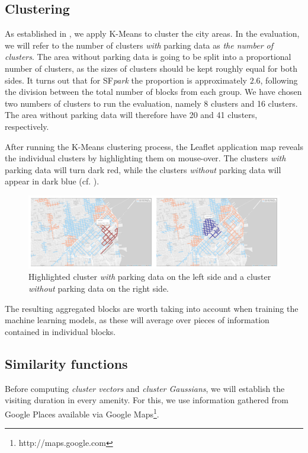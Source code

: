 \subsection{Clustering}
\label{experimental_setup:clustering}
As established in , we apply K-Means to cluster the city areas.
In the evaluation, we will refer to the number of clusters \textit{with} parking data as \textit{the number of clusters}.
The area without parking data is going to be split into a proportional number of clusters, as the sizes of clusters should be kept roughly equal for both sides.
It turns out that for SF\textit{park} the proportion is approximately $2.6$, following the division between the total number of blocks from each group.
We have chosen two numbers of clusters to run the evaluation, namely 8 clusters and 16 clusters.
The area without parking data will therefore have 20 and 41 clusters, respectively. 

After running the K-Means clustering process, the Leaflet application map reveals the individual clusters by highlighting them on mouse-over.
The clusters \textit{with} parking data will turn dark red, while the clusters \textit{without} parking data will appear in dark blue (cf. ). 

\begin{figure}[!ht]
	\centering
	\includegraphics[width=\textwidth]{graphics/highlighted_collage.png}
	\caption{Highlighted cluster \textit{with} parking data on the left side and a cluster \textit{without} parking data on the right side.}
	\label{fig:highlighted_collage}
\end{figure}

The resulting aggregated blocks are worth taking into account when training the machine learning models, as these will average over pieces of information contained in individual blocks. 

\subsection{Similarity functions}
\label{experimental_setup:urban_measure}
Before computing \textit{cluster vectors} and \textit{cluster Gaussians}, we will establish the visiting duration in every amenity.
For this, we use information gathered from Google Places available via Google Maps\footnote{http://maps.google.com}.


